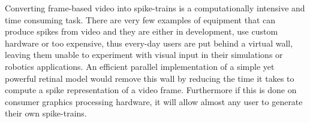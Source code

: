 Converting frame-based video into spike-trains is a computationally intensive 
and time consuming task. There are very few examples of equipment that can 
produce spikes from video and they are either in development, use custom 
hardware or too expensive, thus every-day users are put behind a virtual wall, 
leaving them unable to experiment with visual input in their simulations or 
robotics applications. An efficient parallel implementation of a simple yet 
powerful retinal model would remove this wall by reducing the time it takes to 
compute a spike representation of a video frame. Furthermore if this is done on 
consumer graphics processing hardware, it will allow almost any user to 
generate their own spike-trains. 